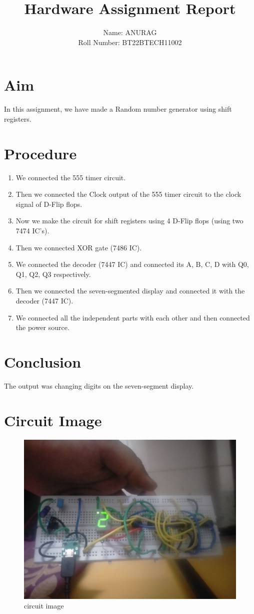\documentclass{article}
\title{Hardware Assignment Report}
\author{Name: ANURAG\\Roll Number: BT22BTECH11002}
\date{}
\begin{document}
\maketitle

\section{Aim}
In this assignment, we have made a Random number generator using shift registers.

\section{Procedure}
\begin{enumerate}
  \item We connected the 555 timer circuit.
  \item Then we connected the Clock output of the 555 timer circuit to the clock signal of D-Flip flops.
  \item Now we make the circuit for shift registers using 4 D-Flip flops (using two 7474 IC's).
  \item Then we connected XOR gate (7486 IC).
  \item We connected the decoder (7447 IC) and connected its A, B, C, D with Q0, Q1, Q2, Q3 respectively.
  \item Then we connected the seven-segmented display and connected it with the decoder (7447 IC).
  \item We connected all the independent parts with each other and then connected the power source.
\end{enumerate}

\section{Conclusion}
The output was changing digits on the seven-segment display.

\section{Circuit Image}
\begin{figure}[ht]
  \centering
  \includegraphics[width=\textwidth]{circuit.jpg}
  \caption{circuit image }
  \label{fig:circuit}
\end{figure}
\end{document}
